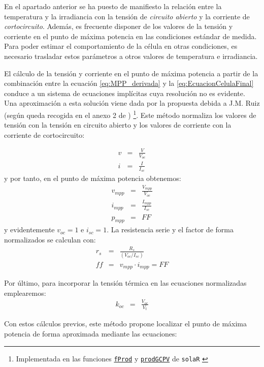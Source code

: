 En el apartado anterior se ha puesto de manifiesto la relación entre
la temperatura y la irradiancia con la tensión de \emph{circuito abierto}
y la corriente de \emph{cortocircuito}. Además, es frecuente disponer
de los valores de la tensión y corriente en el punto de máxima potencia
en las condiciones estándar de medida. Para poder estimar el comportamiento
de la célula en otras condiciones, es necesario trasladar estos parámetros
a otros valores de temperatura e irradiancia.

El cálculo de la tensión y corriente en el punto de máxima potencia
a partir de la combinación entre la ecuación \ref{eq:MPP_derivada}
y la \ref{eq:EcuacionCelulaFinal} conduce a un sistema de ecuaciones
implícitas cuya resolución no es evidente. Una aproximación a esta
solución viene dada por la propuesta debida a J.M. Ruiz (según queda
recogida en el anexo 2 de \citep{Alonso-Garcia2005})%
\footnote{Implementada en las funciones
  \href{http://search.r-project.org/R/library/solaR/html/fProd.html}{\texttt{fProd}}
  y %
 \href{http://search.r-project.org/R/library/solaR/html/prodGCPV.html}{\texttt{prodGCPV}} de \texttt{solaR}
  \cite{Perpinan2012b}}. Este método
normaliza los valores de tensión con la tensión en circuito abierto
y los valores de corriente con la corriente de cortocircuito:

\begin{eqnarray}
v & = & \frac{V}{V_{oc}}\\
i & = & \frac{I}{I_{sc}}\end{eqnarray}
y por tanto, en el punto de máxima potencia obtenemos:\begin{eqnarray}
v_{mpp} & = & \frac{V_{mpp}}{V_{oc}}\\
i_{mpp} & = & \frac{I_{mpp}}{I_{sc}}\\
p_{mpp} & = & FF\end{eqnarray}
y evidentemente $v_{oc}=1$ e $i_{sc}=1$. La resistencia serie y
el factor de forma normalizados se calculan con:\begin{eqnarray}
r_{s} & = & \frac{R_{s}}{(V_{oc}/I_{sc})}\label{eq:rs}\\
ff & = & v_{mpp}\cdot i_{mpp}=FF\end{eqnarray}


Por último, para incorporar la tensión térmica en las ecuaciones normalizadas
emplearemos: \begin{eqnarray}
k_{oc} & = & \frac{V_{oc}}{V_{t}}\label{eq:koc}\end{eqnarray}


Con estos cálculos previos, este método propone localizar el punto
de máxima potencia de forma aproximada mediante las ecuaciones:

